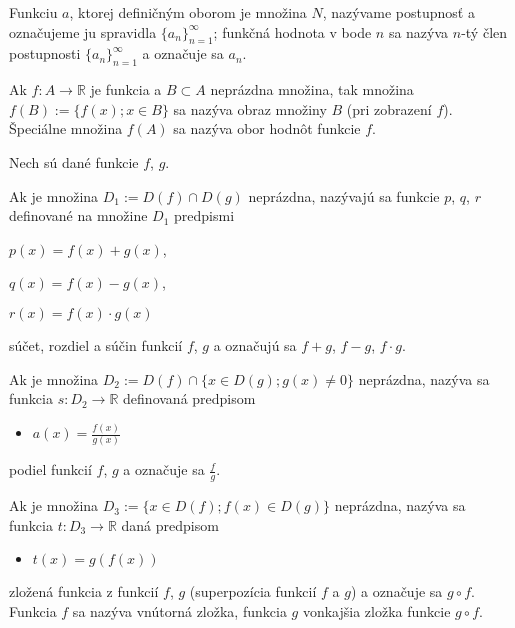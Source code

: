 Funkciu $a$, ktorej definičným oborom je množina $N$, nazývame postupnosť a označujeme ju spravidla $\{a_n\}_{n=1}^\infty$; funkčná hodnota v bode $n$ sa nazýva $n$-tý člen postupnosti $\{a_n\}_{n=1}^\infty$ a označuje sa $a_n$.

Ak $f:A \rightarrow \mathbb{R}$ je funkcia a $B \subset A$ neprázdna množina, tak množina $f(B):=\{f(x);x\in B \}$ sa nazýva obraz množiny $B$ (pri zobrazení $f$). Špeciálne množina $f(A)$ sa nazýva obor hodnôt funkcie $f$.

Nech sú dané funkcie $f$, $g$.

\begin{itemize}
\item Ak je množina $D_1:=D(f)\cap D(g)$ neprázdna, nazývajú sa funkcie $p$, $q$, $r$ definované na množine $D_1$ predpismi
\begin{center}
\item $p(x)=f(x)+g(x)$,
\item $q(x)=f(x)-g(x)$,
\item $r(x)=f(x)\cdot g(x)$
\end{center}
súčet, rozdiel a súčin funkcií $f$, $g$ a označujú sa $f+g$, $f-g$, $f\cdot g$.
\item Ak je množina $D_2:=D(f)\cap \{x\in D(g);g(x)\neq 0\}$ neprázdna, nazýva sa funkcia $s:D_2 \rightarrow \mathbb{R}$ definovaná predpisom 
\begin{itemize}
\item $a(x)=\frac{f(x)}{g(x)}$
\end{itemize}
podiel funkcií $f$, $g$ a označuje sa $\frac{f}{g}$.
\item Ak je množina $D_3:=\{x\in D(f);f(x)\in D(g)\}$ neprázdna, nazýva sa funkcia $t:D_3\rightarrow\mathbb{R}$ daná predpisom
\begin{itemize}
\item $t(x)=g(f(x))$
\end{itemize}
zložená funkcia z funkcií $f$, $g$ (superpozícia funkcií $f$ a $g$) a označuje sa $g \circ f$. Funkcia $f$ sa nazýva vnútorná zložka, funkcia $g$ vonkajšia zložka funkcie $g \circ f$.
\end{itemize}


